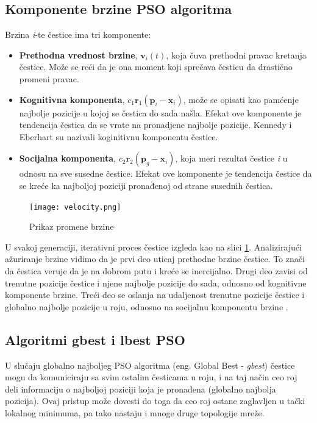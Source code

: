 \documentclass[a4paper]{article}
\begin{document}
\subsection{Komponente brzine PSO algoritma}
Brzina \textit{i}-te čestice ima tri komponente:\\
\begin{itemize}
    \item \textbf{Prethodna vrednost brzine}, $\textbf{v}_i(t)$, koja čuva prethodni pravac kretanja čestice. Može se reći da je ona moment koji sprečava česticu da drastično promeni pravac. 
    \item \textbf{Kognitivna komponenta}, $c_1\textbf{r}_1(\textbf{p}_i - \textbf{x}_i)$,  može se opisati kao pamćenje najbolje pozicije u kojoj se čestica do sada našla. Efekat ove komponente je tendencija čestica da se vrate na pronadjene najbolje pozicije. Kennedy i Eberhart su nazivali koginitivnu komponentu  čestice.
    \item \textbf{Socijalna komponenta}, $c_2\textbf{r}_2(\textbf{p}_g - \textbf{x}_i)$, koja meri rezultat čestice \textit{i} u odnosu na sve susedne čestice. Efekat ove komponente je tendencija čestice da se kreće ka najboljoj poziciji pronađenoj od strane susednih čestica.
\end{itemize}

\begin{figure}[htp]
    \centering
    \texttt{[image: velocity.png]}
    \caption{Prikaz promene brzine}
    \label{fig:velocity}
\end{figure}

U svakoj generaciji, iterativni proces čestice izgleda kao na slici \ref{fig:velocity}. Analizirajući ažuriranje brzine vidimo da je prvi deo uticaj prethodne brzine čestice. To znači da čestica veruje da je na dobrom putu i kreće se inercijalno. Drugi deo zavisi od trenutne pozicije čestice i njene najbolje pozicije do sada, odnosno od kognitivne komponente brzine. Treći deo se oslanja na udaljenost trenutne pozicije čestice i globalno najbolje pozicije u roju, odnosno na socijalnu komponentu brzine \cite{wang2018particle}. 

\subsection{Algoritmi gbest i lbest PSO}
\label{subsec:podnaslov1}

U slučaju globalno najboljeg PSO algoritma (eng. Global Best - \textit{gbest}) čestice mogu da komuniciraju sa svim ostalim česticama u roju, i na taj način ceo roj deli informaciju o najboljoj poziciji koja je pronađena (globalno najbolja pozicija). Ovaj pristup može dovesti do toga da ceo roj ostane zaglavljen u tački lokalnog minimuma, pa tako nastaju i mnoge druge topologije mreže.
\end{document}
